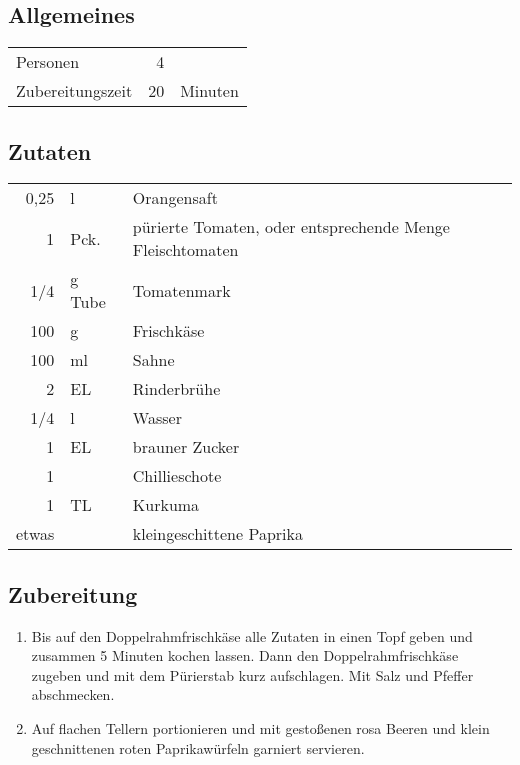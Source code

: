 \subsection*{Allgemeines}
\begin{tabular}{lrl}
	Personen         &                        4 &  \\
	Zubereitungszeit &                       20 & Minuten \\
\end{tabular} 

\subsection*{Zutaten}
\begin{tabular}{rll}
	 0,25 & l      & Orangensaft                                               \\
	    1 & Pck.   & pürierte Tomaten, oder entsprechende Menge Fleischtomaten \\
	  1/4 & g Tube & Tomatenmark                                               \\
	  100 & g      & Frischkäse                                                \\
	  100 & ml     & Sahne                                                     \\
	    2 & EL     & Rinderbrühe                                               \\
	  1/4 & l      & Wasser                                                    \\
	    1 & EL     & brauner Zucker                                            \\
	    1 &        & Chillieschote                                             \\
	    1 & TL     & Kurkuma                                                   \\
	etwas &        & kleingeschittene Paprika
\end{tabular} 
\subsection*{Zubereitung}
\begin{enumerate}
	\item Bis auf den Doppelrahmfrischkäse alle Zutaten in einen Topf geben und zusammen 5 Minuten kochen lassen. Dann den Doppelrahmfrischkäse zugeben und mit dem Pürierstab kurz aufschlagen. Mit Salz und Pfeffer abschmecken. 
	\item Auf flachen Tellern portionieren und mit gestoßenen rosa Beeren und klein geschnittenen roten Paprikawürfeln garniert servieren.
\end{enumerate}

